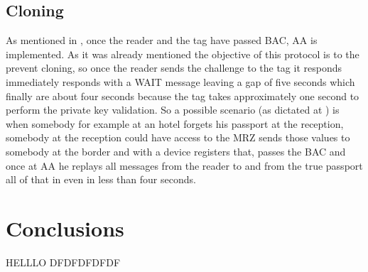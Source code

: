 \documentclass{acm_proc_article-sp}
\begin{document}
\subsection{Cloning}
As mentioned in \cite{MHTR07}, once the reader and the tag have passed BAC, AA is implemented. As it was already mentioned the objective of this protocol is to the prevent cloning, so once the reader sends the challenge to the tag it responds immediately responds with a WAIT message leaving a gap of five seconds which finally are about four seconds because the tag takes approximately one second to perform the private key validation. So a possible scenario (as dictated at \cite{MHTR07}) is when somebody for example at an hotel forgets his passport at the reception, somebody at the reception could have access to the MRZ sends those values to somebody at the border and with a device registers that, passes the BAC and once at AA he replays all messages from the reader to and from the true passport all of that in even in less than four seconds.
\section{Conclusions}


HELLLO DFDFDFDFDF~\cite{Chothia10}


%
%

\balancecolumns
\end{document}
